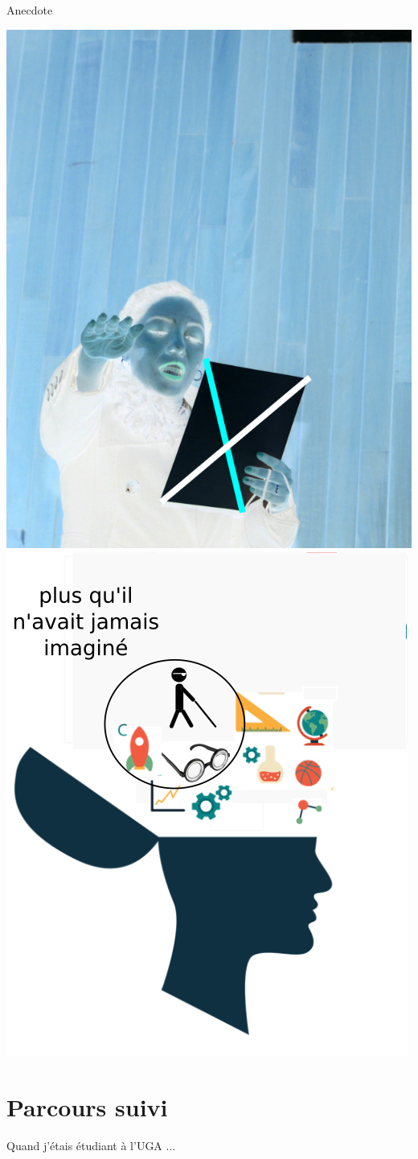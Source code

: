 \documentclass{beamer}
\begin{document}
\begin{frame}
 {Anecdote}

\begin{center}
 \includegraphics[width=0.45\linewidth]{images/juramento2_neg.png}
 \qquad 
 \includegraphics[width=0.45\linewidth]{images/open2.png}
\end{center}

\end{frame}



\section{Parcours suivi}


\begin{frame}

 \centering
 \LARGE Quand j'étais étudiant à l'UGA ...
 
\end{frame}
\end{document}

